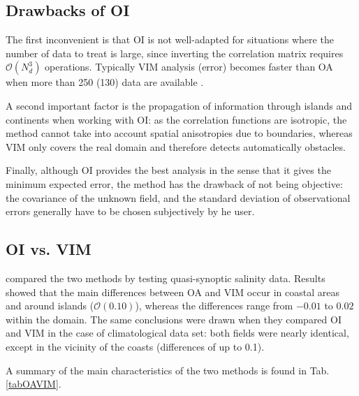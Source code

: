 \subsection{Drawbacks of OI}

The first inconvenient is that OI is not well-adapted for situations where the number of data to treat is large, since inverting the correlation matrix requires  $\mathcal{O}(N_{d}^{3})$ operations. Typically VIM analysis (error) becomes faster than OA when more than 250 (130) data are available \citep{RIXEN00}. 

A second important factor is the propagation of information through islands and continents when working with OI: as the correlation functions are isotropic, the method cannot take into account spatial anisotropies due to boundaries, whereas VIM only covers the real domain and therefore detects automatically obstacles. 

Finally, although OI provides the best analysis in the sense that it gives the minimum expected error, the method has the drawback of not being objective: the covariance of the unknown field, and the standard deviation of observational errors generally have to be chosen subjectively by he user.



\subsection{OI vs. VIM}

\cite{RIXEN00} compared the two methods by testing quasi-synoptic salinity data. Results showed that the main differences between OA and VIM occur in coastal areas and around islands ($\mathcal{O}(0.10)$), whereas the differences range from $-0.01$ to $0.02$ within the domain. The same conclusions were drawn when they compared OI and VIM in the case of climatological data set: both fields were nearly identical, except in the vicinity of the coasts (differences of up to 0.1).

A summary of the main characteristics of the two methods is found in Tab. \ref{tabOAVIM}.


